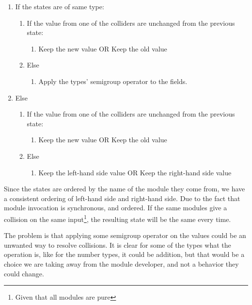 \begin{enumerate}
  \item If the states are of same type:
    \begin{enumerate}
      \item If the value from one of the colliders are unchanged from the previous state:
        \begin{enumerate}
          \item Keep the new value OR Keep the old value
        \end{enumerate}
      \item Else
        \begin{enumerate}
          \item Apply the types' semigroup operator to the fields.
        \end{enumerate}
    \end{enumerate}
  \item Else
    \begin{enumerate}
      \item If the value from one of the colliders are unchanged from the previous state:
        \begin{enumerate}
          \item Keep the new value OR Keep the old value
        \end{enumerate}
      \item Else
        \begin{enumerate}
          \item Keep the left-hand side value OR Keep the right-hand side value
        \end{enumerate}
    \end{enumerate}
\end{enumerate}

Since the states are ordered by the name of the module they come from, we
have a consistent ordering of left-hand side and right-hand side. Due to the
fact that module invocation is synchronous, and ordered. If the same modules
give a collision on the same input\footnote{Given that all modules are pure}, the
resulting state will be the same every time.

The problem is that applying some semigroup operator on the values could be an
unwanted way to resolve collisions. It is clear for some of the types what the
operation is, like for the number types, it could be addition, but that would be
a choice we are taking away from the module developer, and not a behavior they
could change.

